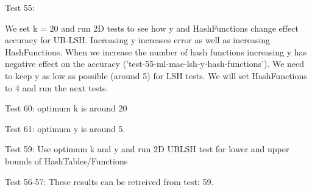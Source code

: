 Test 55:

We set k = 20 and run 2D tests to see how y and HashFunctions change effect accuracy for UB-LSH. Increasing y increases error as well as increasing HashFunctions.
When we increase the number of hash functions increasing y has negative effect on the accuracy
('test-55-ml-mae-lsh-y-hash-functions'). We need to keep y as low as possible (around 5) for LSH tests. We will set HashFunctions to 4 and run the next tests.

Test 60: optimum k is around 20

Test 61: optimum y is around 5.

Test 59: Use optimum k and y and run 2D UBLSH test for lower and upper bounds of HashTables/Functions

Test 56-57: These results can be retreived from test: 59.